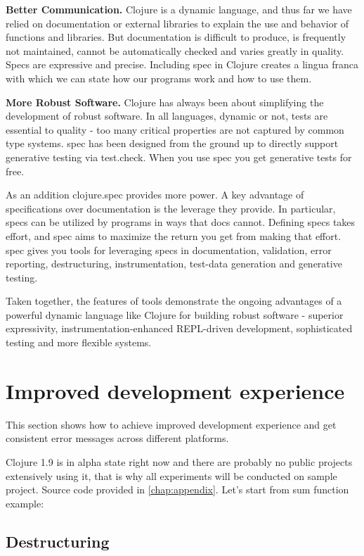 \textbf{Better Communication.} Clojure is a dynamic language, and thus far we have relied
on documentation or external libraries to explain the use and behavior of
functions and libraries. But documentation is difficult to produce, is
frequently not maintained, cannot be automatically checked and varies greatly in
quality. Specs are expressive and precise. Including spec in Clojure creates a
lingua franca with which we can state how our programs work and how to use them.

\textbf{More Robust Software.} Clojure has always been about simplifying the development
of robust software. In all languages, dynamic or not, tests are essential to
quality - too many critical properties are not captured by common type systems.
spec has been designed from the ground up to directly support generative testing
via test.check. When you use spec you get generative tests for free.

As an addition clojure.spec provides more power. A key advantage of
specifications over documentation is the leverage they provide. In particular,
specs can be utilized by programs in ways that docs cannot. Defining specs takes
effort, and spec aims to maximize the return you get from making that effort.
spec gives you tools for leveraging specs in documentation, validation, error
reporting, destructuring, instrumentation, test-data generation and generative
testing.

Taken together, the features of tools demonstrate the ongoing advantages of a
powerful dynamic language like Clojure for building robust software - superior
expressivity, instrumentation-enhanced REPL-driven development, sophisticated
testing and more flexible systems.

\section{Improved development experience}
This section shows how to achieve improved development experience and get
consistent error messages across different platforms.

Clojure 1.9 is in alpha state right now and there are probably no public
projects extensively using it, that is why all experiments will be conducted on
sample project. Source code provided in \ref{chap:appendix}. Let's start from
sum function example:

\subsection{Destructuring}

